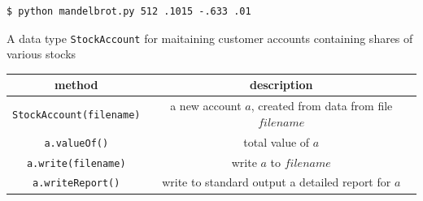 \documentclass[8pt,a4paper,compress]{beamer}
\begin{document}
\begin{frame}[fragile]
\begin{minipage}{200pt}
\begin{lstlisting}[language={}]
$ python mandelbrot.py 512 .1015 -.633 .01
\end{lstlisting}
\end{minipage}%
\hfill
\begin{minipage}{100pt}
\begin{center}
\end{center}
\end{minipage}%
\end{frame}

\begin{frame}[fragile]
\pause

A data type \lstinline{StockAccount} for maitaining customer accounts containing shares of various stocks
\begin{center}
\begin{tabular}{cc}
method & description \\ \hline
\lstinline$StockAccount(filename)$ & a new account $a$, created from data from file $filename$ \\
\lstinline$a.valueOf()$ & total value of $a$ \\
\lstinline$a.write(filename)$ & write $a$ to $filename$ \\
\lstinline$a.writeReport()$ & write to standard output a detailed report for $a$
\end{tabular} 
\end{center}
\end{frame}
\end{document}

